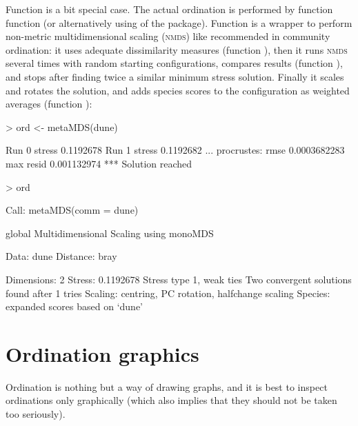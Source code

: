 \documentclass[a4paper,10pt]{article}
\begin{document}
Function  is a bit special case.  The actual ordination
is performed by function  function  (or
alternatively using  of the  package).
Function  is a wrapper to perform non-metric
multidimensional scaling (\textsc{nmds}) like recommended in community
ordination: it uses adequate dissimilarity measures (function
), then it runs \textsc{nmds} several times with random
starting configurations, compares results (function
), and stops after finding twice a similar minimum
stress solution.  Finally it scales and rotates the solution, and adds
species scores to the configuration as weighted averages (function
):
\begin{Schunk}
\begin{Sinput}
> ord <- metaMDS(dune)
\end{Sinput}
\begin{Soutput}
Run 0 stress 0.1192678 
Run 1 stress 0.1192682 
... procrustes: rmse 0.0003682283  max resid 0.001132974 
*** Solution reached
\end{Soutput}
\begin{Sinput}
> ord
\end{Sinput}
\begin{Soutput}
Call:
metaMDS(comm = dune) 

global Multidimensional Scaling using monoMDS

Data:     dune 
Distance: bray 

Dimensions: 2 
Stress:     0.1192678 
Stress type 1, weak ties
Two convergent solutions found after 1 tries
Scaling: centring, PC rotation, halfchange scaling 
Species: expanded scores based on ‘dune’ 
\end{Soutput}
\end{Schunk}

\section{Ordination graphics}

Ordination is nothing but a way of drawing graphs, and it is best to
inspect ordinations only graphically (which also implies that they
should not be taken too seriously).
\end{document}
